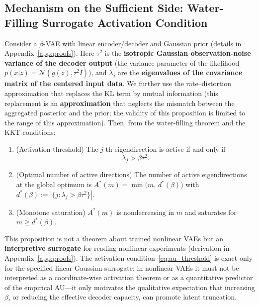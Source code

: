 \documentclass[make,article,submit,pdftex,moreauthors]{Definitions/mdpi}
\newcommand{\dstar}{d^{*}(\beta)}
\begin{document}
\subsection{Mechanism on the Sufficient Side: Water-Filling Surrogate Activation Condition}\label{sec:theory_wf}

\begin{Proposition}\label{thm:linear_vae}
Consider a $\beta$-VAE with linear encoder/decoder and Gaussian prior
(details in Appendix~\ref{app:proofs}).
Here $\tau^2$ is the \textbf{isotropic Gaussian observation-noise variance
of the decoder output} (the variance parameter of the likelihood
$p(x|z) = \mathcal{N}(g(z), \tau^2 I)$), and $\lambda_j$ are the
\textbf{eigenvalues of the covariance matrix of the centered input data}.
We further use the rate--distortion approximation that replaces the KL term
by mutual information (this replacement is an \textbf{approximation} that
neglects the mismatch between the aggregated posterior and the prior; the
validity of this proposition is limited to the range of this
approximation).
Then, from the water-filling theorem and the KKT conditions:
\begin{enumerate}
  \item (Activation threshold) The $j$-th eigendirection is active if and
        only if
        \begin{equation}
          \lambda_j > \beta \tau^2 .
          \label{eq:au_threshold}
        \end{equation}
  \item (Optimal number of active directions)
        The number of active eigendirections at the global optimum is
        $A^*(m) = \min\bigl(m,\, \dstar\bigr)$ with
        $\dstar := |\{j : \lambda_j > \beta\tau^2\}|$.
  \item (Monotone saturation) $A^*(m)$ is nondecreasing in $m$ and
        saturates for $m \geq \dstar$.
\end{enumerate}
This proposition is not a theorem about trained nonlinear VAEs but an
\textbf{interpretive surrogate} for reading nonlinear experiments
(derivation in Appendix~\ref{app:proofs}).
The activation condition~\eqref{eq:au_threshold} is exact only for the
specified linear-Gaussian surrogate; in nonlinear VAEs it must not be
interpreted as a coordinate-wise activation theorem or as a quantitative
predictor of the empirical AU---it only motivates the qualitative
expectation that increasing $\beta$, or reducing the effective decoder
capacity, can promote latent truncation.
\end{Proposition}
\end{document}
